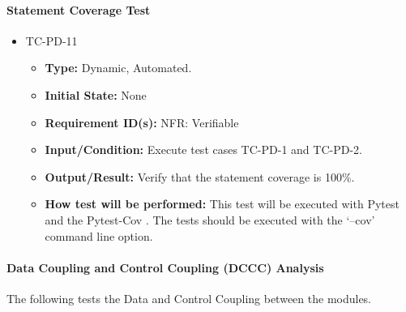\documentclass[12pt, titlepage]{article}
\begin{document}
\paragraph{Statement Coverage Test}

\begin{itemize}
\item{TC-PD-11\\}
\begin{itemize}

\item{\textbf{Type:}} Dynamic, Automated.
					
\item{\textbf{Initial State:}} None

\item{\textbf{Requirement ID(s):}} NFR: Verifiable
					
\item{\textbf{Input/Condition:}}  Execute test cases TC-PD-1 and TC-PD-2.
					
\item{\textbf{Output/Result:}} Verify that the statement coverage is 100\%.

\item{\textbf{How test will be performed:}}  This test will be executed with Pytest \cite{Pytest} and 
the Pytest-Cov \cite{PyTest-Cov}. The tests should be executed with the `--cov' command line option.

\end{itemize}
\end{itemize}

\paragraph{Data Coupling and Control Coupling (DCCC) Analysis}

The following tests the Data and Control Coupling between the modules. 
\end{document}
